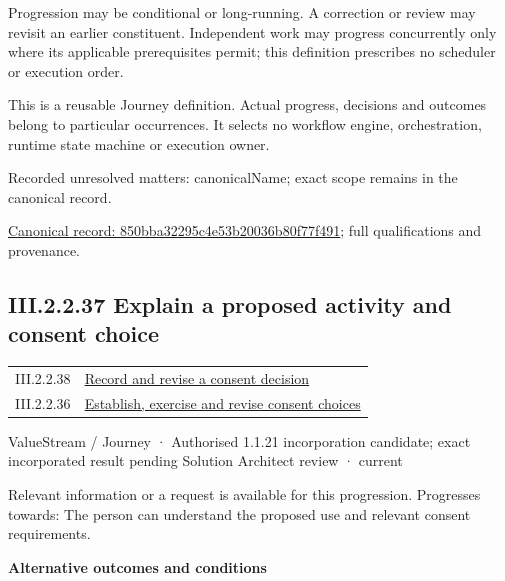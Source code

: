 Progression may be conditional or long-running. A correction or review may revisit an earlier constituent. Independent work may progress concurrently only where its applicable prerequisites permit; this definition prescribes no scheduler or execution order.



This is a reusable Journey definition. Actual progress, decisions and outcomes belong to particular occurrences. It selects no workflow engine, orchestration, runtime state machine or execution owner.


{\small Recorded unresolved matters: canonicalName; exact scope remains in the canonical record.}\par
{\footnotesize \href{../../../../../../../continuum/strategy/value-stream/850bba32295c4e53b20036b80f77f491.md}{Canonical record: 850bba32295c4e53b20036b80f77f491}; full qualifications and provenance.}\par
\subsection*{III.2.2.37 Explain a proposed activity and consent choice}
\label{navigation:III.2.2.37}

\begin{longtable}{p{.22\linewidth}p{.73\linewidth}}
III.2.2.38 & \hyperref[element:74779c85619741d18053a2304457190b]{Record and revise a consent decision} \\
III.2.2.36 & \hyperref[element:850bba32295c4e53b20036b80f77f491]{Establish, exercise and revise consent choices} \\
\end{longtable}
\label{element:ddc83b3ab1e646d5bf86578001959480}
{\small ValueStream / Journey · Authorised 1.1.21 incorporation candidate; exact incorporated result pending Solution Architect review · current}\par

Relevant information or a request is available for this progression. Progresses towards: The person can understand the proposed use and relevant consent requirements.



\par\medskip\textbf{Alternative outcomes and conditions}\par


